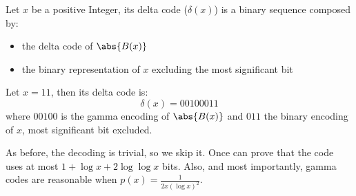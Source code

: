 \documentclass{subfiles}
\begin{document}
    Let \(x\) be a positive Integer, 
        its delta code (\(\delta(x)\)) is a binary sequence composed by:
        \begin{itemize}
            \item the delta code of \(\abs{B(x)}\)
            \item the binary representation of \(x\) excluding the most significant bit
        \end{itemize}

    \begin{example*}
        Let \(x = 11\), then its delta code is:
            \[
                \delta(x) = 001 00 011
            \]
        where \(00100\) is the gamma encoding of \(\abs{B(x)}\) and 
            \(011\) the binary encoding of \(x\), most significant bit excluded.
    \end{example*}
    
    As before, the decoding is trivial, so we skip it.
    Once can prove that the code uses at most \(1 + \log x + 2 \log \log x\) bits.
    Also, and most importantly,
        gamma codes are reasonable when \(p(x) = \tfrac{1}{2x (\log x)^{2}}\).
\end{document}
